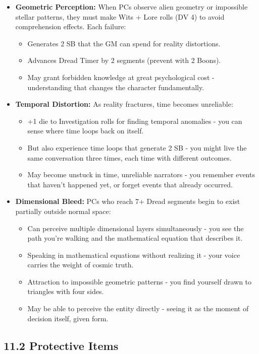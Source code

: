 \documentclass[11pt]{article}
\begin{document}
\begin{itemize}
\item \textbf{Geometric Perception:} When PCs observe alien geometry or impossible stellar patterns, they must make Wits + Lore rolls (DV 4) to avoid comprehension effects. Each failure:
\begin{itemize}
\item Generates 2 SB that the GM can spend for reality distortions.
\item Advances Dread Timer by 2 segments (prevent with 2 Boons).
\item May grant forbidden knowledge at great psychological cost - understanding that changes the character fundamentally.
\end{itemize}
\item \textbf{Temporal Distortion:} As reality fractures, time becomes unreliable:
\begin{itemize}
\item +1 die to Investigation rolls for finding temporal anomalies - you can sense where time loops back on itself.
\item But also experience time loops that generate 2 SB - you might live the same conversation three times, each time with different outcomes.
\item May become unstuck in time, unreliable narrators - you remember events that haven't happened yet, or forget events that already occurred.
\end{itemize}
\item \textbf{Dimensional Bleed:} PCs who reach 7+ Dread segments begin to exist partially outside normal space:
\begin{itemize}
\item Can perceive multiple dimensional layers simultaneously - you see the path you're walking and the mathematical equation that describes it.
\item Speaking in mathematical equations without realizing it - your voice carries the weight of cosmic truth.
\item Attraction to impossible geometric patterns - you find yourself drawn to triangles with four sides.
\item May be able to perceive the entity directly - seeing it as the moment of decision itself, given form.
\end{itemize}
\end{itemize}

\subsection*{11.2 Protective Items}
\end{document}
